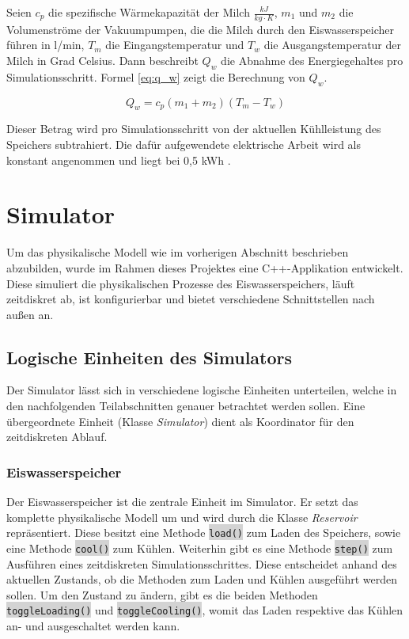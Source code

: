 Seien $ c_p $ die spezifische Wärmekapazität der Milch $ \frac{kJ}{kg \cdot K} $, $ m_1 $ und $ m_2 $ die Volumenströme der Vakuumpumpen, die die Milch durch den Eiswasserspeicher führen in l/min, $ T_m $ die Eingangstemperatur und $ T_w $ die Ausgangstemperatur der Milch in Grad Celsius. Dann beschreibt $ Q_w $ die Abnahme des Energiegehaltes pro Simulationsschritt. Formel \ref{eq:q_w} zeigt die Berechnung von $ Q_w $.

\begin{equation}\label{eq:q_w}
Q_w = c_p (m_1 + m_2) (T_m - T_w)
\end{equation}

Dieser Betrag wird pro Simulationsschritt von der aktuellen Kühlleistung des Speichers subtrahiert. Die dafür aufgewendete elektrische Arbeit wird als konstant angenommen und liegt bei 0,5 kWh \cite{kusow}.

\section{Simulator}
\label{software_simulator}

Um das physikalische Modell wie im vorherigen Abschnitt beschrieben abzubilden, wurde im Rahmen dieses Projektes eine C++-Applikation entwickelt. Diese simuliert die physikalischen Prozesse des Eiswasserspeichers, läuft zeitdiskret ab, ist konfigurierbar und bietet verschiedene Schnittstellen nach außen an. 

\subsection{Logische Einheiten des Simulators}
Der Simulator lässt sich in verschiedene logische Einheiten unterteilen, welche in den nachfolgenden Teilabschnitten genauer betrachtet werden sollen. Eine übergeordnete Einheit (Klasse \emph{Simulator}) dient als Koordinator für den zeitdiskreten Ablauf.

\subsubsection{Eiswasserspeicher}
Der Eiswasserspeicher ist die zentrale Einheit im Simulator. Er setzt das komplette physikalische Modell um und wird durch die Klasse \emph{Reservoir} repräsentiert. Diese besitzt eine Methode \colorbox{lightgrey}{\lstinline[basicstyle=\ttfamily]|load()|} zum Laden des Speichers, sowie eine Methode \colorbox{lightgrey}{\lstinline[basicstyle=\ttfamily]|cool()|} zum Kühlen. Weiterhin gibt es eine Methode \colorbox{lightgrey}{\lstinline[basicstyle=\ttfamily]|step()|} zum Ausführen eines zeitdiskreten Simulationsschrittes. Diese entscheidet anhand des aktuellen Zustands, ob die Methoden zum Laden und Kühlen ausgeführt werden sollen. Um den Zustand zu ändern, gibt es die beiden Methoden \colorbox{lightgrey}{\lstinline[basicstyle=\ttfamily]|toggleLoading()|} und \colorbox{lightgrey}{\lstinline[basicstyle=\ttfamily]|toggleCooling()|}, womit das Laden respektive das Kühlen an- und ausgeschaltet werden kann.

